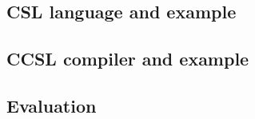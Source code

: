 \subsection{CSL language and example}

\subsection{CCSL compiler and example}

\subsection{Evaluation}